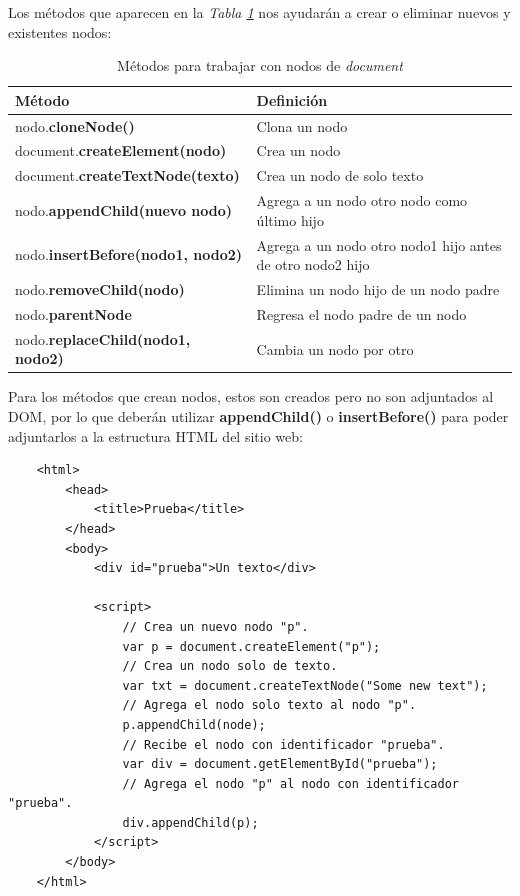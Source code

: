 Los métodos que aparecen en la \textit{Tabla \ref{tab: 10}} nos ayudarán a crear o eliminar nuevos y existentes nodos:
\begin{table}[H]
    \begin{center}
        \caption{Métodos para trabajar con nodos de \textit{document}}
        \label{tab: 10}
        \begin{tabular}{m{7cm} m{7cm}}
            \hline
            \textbf{Método} & \textbf{Definición} \\
            \hline
            nodo.\textbf{cloneNode()}                           & Clona un nodo \\
            document.\textbf{createElement(nodo)}               & Crea un nodo \\
            document.\textbf{createTextNode(texto)}             & Crea un nodo de solo texto \\
            nodo.\textbf{appendChild(nuevo nodo)}               & Agrega a un nodo otro nodo como último hijo \\
            nodo.\textbf{insertBefore(nodo1, nodo2)}            & Agrega a un nodo otro nodo1 hijo antes de otro nodo2 hijo \\
            nodo.\textbf{removeChild(nodo)}                     & Elimina un nodo hijo de un nodo padre \\
            nodo.\textbf{parentNode}                            & Regresa el nodo padre de un nodo \\
            nodo.\textbf{replaceChild(nodo1, nodo2)}    & Cambia un nodo por otro \\
            \hline
        \end{tabular}
    \end{center}    
\end{table}

Para los métodos que crean nodos, estos son creados pero no son adjuntados al DOM, por lo que deberán utilizar \textbf{appendChild()} o \textbf{insertBefore()} para poder adjuntarlos a la estructura HTML del sitio web:
\begin{lstlisting}
    <html>
        <head>
            <title>Prueba</title>
        </head>
        <body>
            <div id="prueba">Un texto</div>
            
            <script>
                // Crea un nuevo nodo "p".
                var p = document.createElement("p");
                // Crea un nodo solo de texto.
                var txt = document.createTextNode("Some new text");
                // Agrega el nodo solo texto al nodo "p".
                p.appendChild(node);
                // Recibe el nodo con identificador "prueba".
                var div = document.getElementById("prueba");
                // Agrega el nodo "p" al nodo con identificador "prueba".
                div.appendChild(p);
            </script>
        </body>
    </html>
\end{lstlisting}


